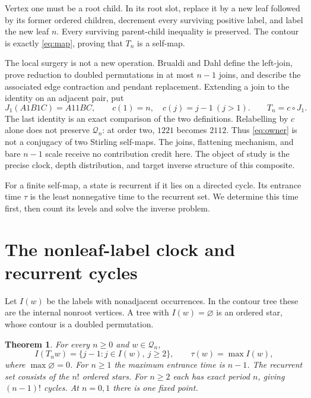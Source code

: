 \documentclass[a4paper,10pt]{amsart}
\newtheorem{theorem}{Theorem}[section]
\theoremstyle{remark}
\newcommand{\Q}{\mathcal Q}
\begin{document}
Vertex one must be a root child. In its root slot, replace it by a new
leaf followed by its former ordered children, decrement every surviving
positive label, and label the new leaf $n$. Every surviving parent-child
inequality is preserved. The contour is exactly \eqref{eq:map}, proving
that $T_n$ is a self-map.

The local surgery is not a new operation.
Brualdi and Dahl \cite[Theorem 8 and Section 5]{brualdi2024multipermutations}
define the left-join, prove reduction to doubled permutations in at most
$n-1$ joins, and describe the associated edge contraction and pendant
replacement.
Extending a join to the identity on an adjacent pair, put
\begin{equation}\label{eq:owner}
 J_1(A1B1C)=A11BC,\qquad
 c(1)=n,\quad c(j)=j-1\ (j>1).
 \qquad T_n=c\circ J_1 .
\end{equation}
The last identity is an exact comparison of the two definitions.
Relabelling by $c$ alone does not preserve $\Q_n$: at order two,
$1221$ becomes $2112$. Thus \eqref{eq:owner} is not a conjugacy of two
Stirling self-maps. The joins, flattening mechanism, and bare $n-1$ scale
receive no contribution credit here. The object of study is the precise
clock, depth distribution, and target inverse structure of this composite.

For a finite self-map, a state is recurrent if it lies on a directed
cycle. Its entrance time $\tau$ is the least nonnegative time to the
recurrent set. We determine this time first, then count its levels and
solve the inverse problem.

\section{The nonleaf-label clock and recurrent cycles}

Let $I(w)$ be the labels with nonadjacent occurrences. In the contour tree
these are the internal nonroot vertices. A tree with $I(w)=\varnothing$
is an ordered star, whose contour is a doubled permutation.

\begin{theorem}\label{thm:clock}
For every $n\ge0$ and $w\in\Q_n$,
\[
 I(T_nw)=\{j-1:j\in I(w),\ j\ge2\},
 \qquad \tau(w)=\max I(w),
\]
where $\max\varnothing=0$. For $n\ge1$ the maximum entrance time is $n-1$.
The recurrent set consists of the $n!$ ordered stars. For $n\ge2$ each
has exact period $n$, giving $(n-1)!$ cycles. At $n=0,1$ there is one
fixed point.
\end{theorem}
\end{document}
